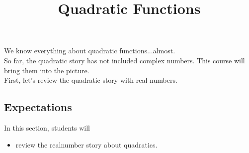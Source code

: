 \documentclass{ximera}
\title{Quadratic Functions}
\begin{document}
\begin{abstract}
\end{abstract}
\maketitle



We know everything about quadratic functions...almost. \\

So far, the quadratic story has not included complex numbers.  This course will bring them into the picture. \\



First, let's review the quadratic story with real numbers.













\subsection{Expectations}

\begin{sectionOutcomes}
In this section, students will 

\begin{itemize}
\item review the realnumber story about quadratics.
\end{itemize}
\end{sectionOutcomes}
\end{document}
